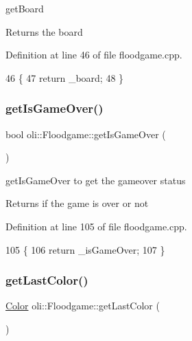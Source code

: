 get\+Board 

\begin{DoxyReturn}{Returns}
the board 
\end{DoxyReturn}


Definition at line 46 of file floodgame.\+cpp.


\begin{DoxyCode}
46                           \{
47     \textcolor{keywordflow}{return} \_board;
48 \}
\end{DoxyCode}
\hypertarget{classoli_1_1_floodgame_a839915256ec11211fdbf95195c8e51cb}{}\label{classoli_1_1_floodgame_a839915256ec11211fdbf95195c8e51cb} 
\subsubsection{\texorpdfstring{get\+Is\+Game\+Over()}{getIsGameOver()}}
{\footnotesize\ttfamily bool oli\+::\+Floodgame\+::get\+Is\+Game\+Over (\begin{DoxyParamCaption}{ }\end{DoxyParamCaption})}



get\+Is\+Game\+Over to get the gameover status 

\begin{DoxyReturn}{Returns}
if the game is over or not 
\end{DoxyReturn}


Definition at line 105 of file floodgame.\+cpp.


\begin{DoxyCode}
105                              \{
106     \textcolor{keywordflow}{return} \_isGameOver;
107 \}
\end{DoxyCode}
\hypertarget{classoli_1_1_floodgame_ab302cc4ae3712da0de83520cb86d9567}{}\label{classoli_1_1_floodgame_ab302cc4ae3712da0de83520cb86d9567} 
\subsubsection{\texorpdfstring{get\+Last\+Color()}{getLastColor()}}
{\footnotesize\ttfamily \hyperlink{namespaceoli_aac44697e43b3ab2ad32fe892ab2276eb}{Color} oli\+::\+Floodgame\+::get\+Last\+Color (\begin{DoxyParamCaption}{ }\end{DoxyParamCaption})}



